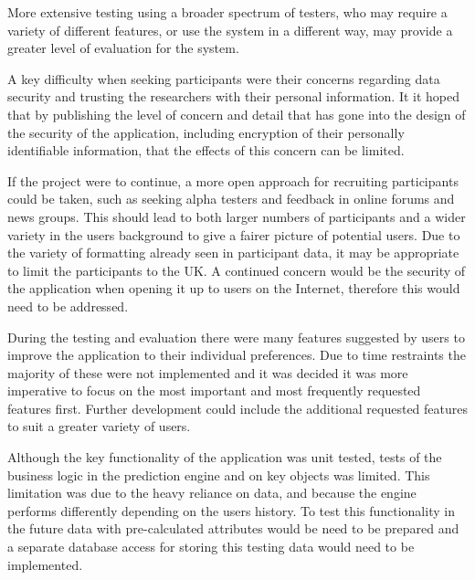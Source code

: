 More extensive testing using a broader spectrum of testers, who may require a variety of different features, or use the system in a different way, may provide a greater level of evaluation for the system.

A key difficulty when seeking participants were their concerns regarding data security and trusting the researchers with their personal information. It it hoped that by publishing the level of concern and detail that has gone into the design of the security of the application, including encryption of their personally identifiable information, that the effects of this concern can be limited.

If the project were to continue, a more open approach for recruiting participants could be taken, such as seeking alpha testers and feedback in online forums and news groups. This should lead to both larger numbers of participants and a wider variety in the users background to give a fairer picture of potential users. Due to the variety of formatting already seen in participant data, it may be appropriate to limit the participants to the UK. A continued concern would be the security of the application when opening it up to users on the Internet, therefore this would need to be addressed.

During the testing and evaluation there were many features suggested by users to improve the application to their individual preferences. Due to time restraints the majority of these were not implemented and it was decided it was more imperative to focus on the most important and most frequently requested features first. Further development could include the additional requested features to suit a greater variety of users.

Although the key functionality of the application was unit tested, tests of the business logic in the prediction engine and on key objects was limited. This limitation was due to the heavy reliance on data, and because the engine performs differently depending on the users history. To test this functionality in the future data with pre-calculated attributes would be need to be prepared and a separate database access for storing this testing data would need to be implemented.

\begin{comment}
SELECT user_id, MAX(  `dateposted` ) , MIN(  `dateposted` ) , DATEDIFF( MAX(  `dateposted` ) , MIN(  `dateposted` ) ) /30
FROM transaction
GROUP BY  `user_id` 
ORDER BY DATEDIFF( MAX(  `dateposted` ) , MIN(  `dateposted` ) ) ASC 
\end{comment}

